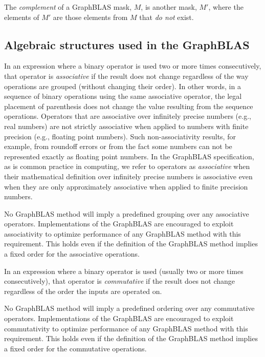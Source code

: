  The \emph{complement} of a 
GraphBLAS mask, $M$, is another mask, $M'$, where the elements of $M'$
are those elements from $M$ that \emph{do not} exist.  
\glossEnd


\subsection{Algebraic structures used in the GraphBLAS}

\glossBegin
{} In an expression where a binary operator is used 
two or more times consecutively, that operator is \emph{associative} if the result 
does not change regardless of the way operations are grouped (without changing their order). 
In other words, in a sequence of binary operations using the same associative 
operator, the legal placement of parenthesis does not change the value resulting 
from the sequence operations.  Operators that are associative over infinitely 
precise numbers (e.g., real numbers) are not strictly associative when applied to 
numbers with finite precision (e.g., floating point numbers). Such non-associativity 
results, for example, from roundoff errors or from the fact some numbers can not 
be represented exactly as floating point numbers.   In the GraphBLAS specification, 
as is common practice in computing, we refer to operators as \emph{associative} 
when their mathematical definition over infinitely precise numbers is associative 
even when they are only approximately associative when applied to finite precision 
numbers.

No GraphBLAS method will imply a predefined grouping over any associative operators. 
Implementations of the GraphBLAS are encouraged to exploit associativity to optimize 
performance of any GraphBLAS method with this requirement. This holds even if the 
definition of the GraphBLAS method implies a fixed order for the associative operations.

 In an expression where a binary operator is used (usually
two or more times consecutively), that operator is \emph{commutative} if the result does 
not change regardless of the order the inputs are operated on.

No GraphBLAS method will imply a predefined ordering over any commutative operators. 
Implementations of the GraphBLAS are encouraged to exploit commutativity to optimize 
performance of any GraphBLAS method with this requirement. This holds even if the 
definition of the GraphBLAS method implies a fixed order for the commutative operations.

